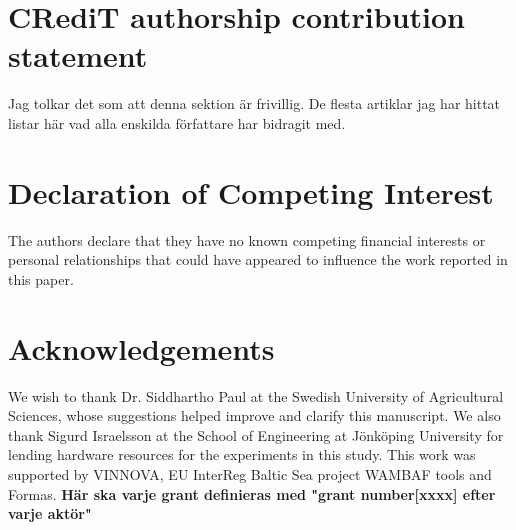 \documentclass[11pt, review]{elsarticle} %
\begin{document}
\section*{CRediT authorship contribution statement}
Jag tolkar det som att denna sektion är frivillig. De flesta artiklar jag har hittat listar här vad alla enskilda författare har bidragit med.

\section*{Declaration of Competing Interest}
The authors declare that they have no known competing financial interests or personal relationships that could have appeared to influence the work reported in this paper.

\section*{Acknowledgements}
We wish to thank Dr. Siddhartho Paul at the Swedish University of Agricultural Sciences, whose suggestions helped improve and clarify this manuscript. We also thank Sigurd Israelsson at the School of Engineering at J\"onk\"oping University for lending hardware resources for the experiments in this study. This work was supported by VINNOVA, EU InterReg Baltic Sea project WAMBAF tools and Formas. \textbf{Här ska varje grant definieras med "grant number[xxxx] efter varje aktör"}



\end{document}
